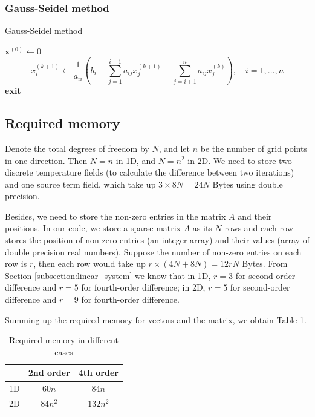 \documentclass{article}
\begin{document}
\subsubsection{Gauss-Seidel method}
\begin{algorithm}[H]
\caption{Gauss-Seidel method}
\begin{algorithmic}
\STATE $\bm x^{(0)} \leftarrow 0$
\STATE $$x_i^{(k+1)} \leftarrow \frac{1}{a_{ii}}\left(b_i - \sum_{j=1}^{i-1} a_{ij}x_j^{(k+1)}
    - \sum_{j=i+1}^n a_{ij}x_j^{(k)}\right), \quad i = 1, ..., n$$
\STATE       \textbf{exit}
    \ENDIF
\ENDFOR
\end{algorithmic}
\end{algorithm}

\subsection{Required memory}
Denote the total degrees of freedom by $N$, and let $n$ be the number of grid points in one direction. Then
$N = n$ in 1D, and $N = n^2$ in 2D. We need to store two discrete temperature fields (to calculate
the difference between two iterations) and one source term field,
which take up $3\times 8N = 24N$ Bytes using double precision. 

Besides, we need to store the non-zero entries in the matrix $A$ and their positions. In our code, we store
a sparse matrix $A$ as its $N$ rows and each row stores the position of non-zero entries (an integer array)
and their values (array of double precision real numbers). Suppose the number of non-zero entries on each row
is $r$, then each row would take up $r \times (4N + 8N) = 12 rN$ Bytes. From 
Section \ref{subsection:linear_system} we know that in 1D, $r = 3$ for second-order difference 
and $r = 5$ for fourth-order difference; in 2D, $r = 5$ for second-order difference and $r = 9$ for
fourth-order difference.

Summing up the required memory for vectors and the matrix, we obtain Table \ref{table:memory}.
\begin{table}[h]
\centering
\begin{tabular}{c|c|c}
    \hline
         & 2nd order & 4th order \\
    \hline
    1D   & $60n$     & $84n$     \\
    \hline
    2D   & $84n^2$   & $132n^2$  \\
    \hline
\end{tabular}
\caption{Required memory in different cases}
\label{table:memory}
\end{table}
\end{document}
